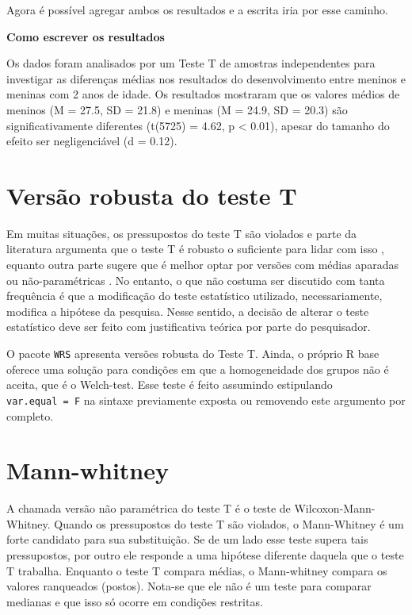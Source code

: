 \documentclass[
]{book}
\begin{document}
Agora é possível agregar ambos os resultados e a escrita iria por esse caminho.

\begin{writing}
\textbf{Como escrever os resultados}

Os dados foram analisados por um Teste T de amostras independentes para
investigar as diferenças médias nos resultados do desenvolvimento entre
meninos e meninas com 2 anos de idade. Os resultados mostraram que os
valores médios de meninos (M = 27.5, SD = 21.8) e meninas (M = 24.9, SD
= 20.3) são significativamente diferentes (t(5725) = 4.62, p \textless{}
0.01), apesar do tamanho do efeito ser negligenciável (d = 0.12).
\end{writing}

\hypertarget{versuxe3o-robusta-do-teste-t}{%
\section{Versão robusta do teste T}\label{versuxe3o-robusta-do-teste-t}}

Em muitas situações, os pressupostos do teste T são violados e parte da literatura argumenta que o teste T é robusto o suficiente para lidar com isso \citep{Lumley2002}, equanto outra parte sugere que é melhor optar por versões com médias aparadas ou não-paramétricas \citep{Field2017}. No entanto, o que não costuma ser discutido com tanta frequência é que a modificação do teste estatístico utilizado, necessariamente, modifica a hipótese da pesquisa. Nesse sentido, a decisão de alterar o teste estatístico deve ser feito com justificativa teórica por parte do pesquisador.

O pacote \texttt{WRS} apresenta versões robusta do Teste T. Ainda, o próprio R base oferece uma solução para condições em que a homogeneidade dos grupos não é aceita, que é o Welch-test. Esse teste é feito assumindo estipulando \texttt{var.equal\ =\ F} na sintaxe previamente exposta ou removendo este argumento por completo.

\hypertarget{mann-whitney}{%
\section{Mann-whitney}\label{mann-whitney}}

A chamada versão não paramétrica do teste T é o teste de Wilcoxon-Mann-Whitney. Quando os pressupostos do teste T são violados, o Mann-Whitney é um forte candidato para sua substituição. Se de um lado esse teste supera tais pressupostos, por outro ele responde a uma hipótese diferente daquela que o teste T trabalha. Enquanto o teste T compara médias, o Mann-whitney compara os valores ranqueados (postos). Nota-se que ele não é um teste para comparar medianas e que isso só ocorre em condições restritas.
\end{document}

